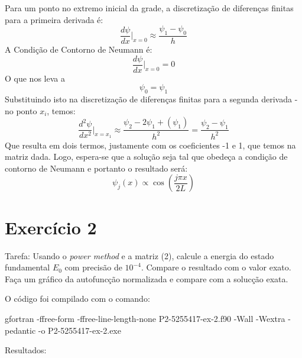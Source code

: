 \documentclass[12pt, a4paper]{article} %
\begin{document}
        Para um ponto no extremo inicial da grade, a discretiza\c{c}\~ao de diferen\c{c}as finitas para a primeira derivada \'e:
        \begin{equation}
            \frac{d\psi}{dx} \bigg|_{x=0} \approx \frac{\psi_1 - \psi_0}{h}
        \end{equation}
        A Condi\c{c}\~ao de Contorno de Neumann é:
        \begin{equation}
            \frac{d\psi}{dx} \bigg|_{x=0} = 0
        \end{equation}
        O que nos leva a
        \begin{equation}
            \psi_0 = \psi_1
        \end{equation}
        Substituindo isto na discretiza\c{c}\~ao de diferen\c{c}as finitas para a segunda derivada - no ponto $x_i$, temos:
        \begin{equation}
            \frac{d^2\psi}{dx^2} \bigg|_{x=x_1} \approx \frac{\psi_2 - 2\psi_1 + (\psi_1)}{h^2} = \frac{\psi_2 - \psi_1}{h^2}
        \end{equation}
        Que resulta em dois termos, justamente com os coeficientes -1 e 1, que temos na matriz dada.
        Logo, espera-se que a solu\c{c}\~ao seja tal que obede\c{c}a a condi\c{c}\~ao de contorno de Neumann e portanto o resultado ser\'a:
        \begin{equation*}
            \psi_{j}(x) \propto \cos\left(\frac{j\pi x}{2L}\right)
        \end{equation*}

    \section{Exercício 2}

        Tarefa: Usando o \textit{power method} e a matriz (2), calcule a energia do estado fundamental $E_{0}$ com precis\~ao de $10^{-4}$. Compare o resultado com o valor exato. Fa\c{c}a um gr\'afico da autofunc\c{c}\~ao normalizada e compare com a soluc\c{c}\~ao exata.

        O c\'odigo foi compilado com o comando:

    gfortran -ffree-form -ffree-line-length-none P2-5255417-ex-2.f90 -Wall -Wextra -pedantic -o P2-5255417-ex-2.exe

        Resultados:
\end{document}
